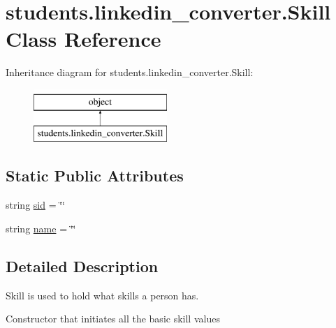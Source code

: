 \hypertarget{classstudents_1_1linkedin__converter_1_1_skill}{\section{students.\-linkedin\-\_\-converter.\-Skill Class Reference}
\label{classstudents_1_1linkedin__converter_1_1_skill}
}
Inheritance diagram for students.\-linkedin\-\_\-converter.\-Skill\-:\begin{figure}[H]
\begin{center}
\leavevmode
\includegraphics[height=2.000000cm]{classstudents_1_1linkedin__converter_1_1_skill}
\end{center}
\end{figure}
\subsection*{Static Public Attributes}
\begin{DoxyCompactItemize}
\item 
string \hyperlink{classstudents_1_1linkedin__converter_1_1_skill_a833fda242e2aa99c0b3d146fd02edfda}{sid} = \char`\"{}\char`\"{}
\item 
string \hyperlink{classstudents_1_1linkedin__converter_1_1_skill_a2d5ed72765fe5fb834aa89ece121e53e}{name} = \char`\"{}\char`\"{}
\end{DoxyCompactItemize}


\subsection{Detailed Description}
\begin{DoxyVerb}Skill is used to hold what skills a person has.\end{DoxyVerb}
\begin{DoxyVerb}Constructor that initiates all the basic skill values\end{DoxyVerb}
 

